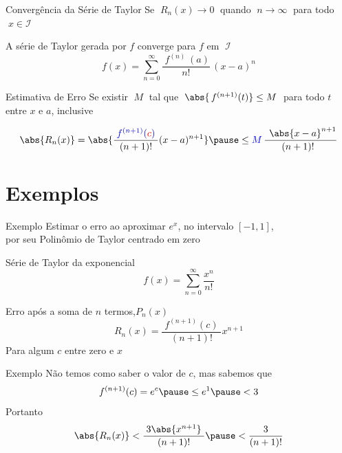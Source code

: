 \begin{frame}{Convergência da Série de Taylor}
Se \emph{\(\;R_n(x)\to 0\;\)} quando \emph{\(\;n\to\infty\;\)}
para todo \(\;x\in\mathcal{I}\;\)

\vspace{\baselineskip}
A série de Taylor gerada por $f$ converge para $f$ em \(\;\mathcal{I}\;\)
\[
  f(x) = \sum_{n=0}^\infty \frac{\;f^{(n)\;}(a)}{n!}\,(x-a)^n
\]
\end{frame}

\begin{frame}{Estimativa de Erro}
Se existir \(\;M\;\) tal que  \emph{\(\;\abs{\,f^{(n+1)}(t)} \leq M \;\)}
para todo \(t\) entre \(x\) e \(a\), inclusive

\pause
\vspace{\baselineskip}
\[
  \abs{R_n(x)}
  = \abs{\frac{\;{\color{blue}f^{(n+1)}({\color{red}c})}\;}{(n+1)!}(x-a)^{n+1}} \pause
  \leq {\color{blue} M}\, \frac{\;\,\abs{x-a}^{n+1}}{(n+1)!\;\;}
\]
\end{frame}

\section{Exemplos}

\addtocounter{exemplo}{1}
\begin{frame}{Exemplo \theexemplo}
    Estimar o erro ao aproximar \(e^x\), no intervalo \([-1, 1]\), \\
    por seu Polinômio de Taylor centrado em zero

   \vspace{0.5\baselineskip}
   \pause
   Série de Taylor da exponencial
   \[
     f(x) = \sum_{n=0}^\infty \frac{x^n}{n!}
   \]

   \pause
   Erro após a soma de $n$ termos,\(P_n(x)\)
   \[
     R_n(x)=\frac{\;f^{(n+1)}(c)\;}{(n+1)!}x^{n+1}
   \]
   Para algum $c$ entre zero e $x$
\end{frame}

\begin{frame}{Exemplo \theexemplo}
  Não temos como saber o valor de $c$\pause, mas sabemos que
  \[
    f^{(n+1)}(c) = e^c \pause \leq e^1 \pause < 3
  \]
  \pause
  Portanto
  \[
    \abs{R_n(x)} < \frac{\;3\abs{x^{n+1}}\;}{(n+1)!} \pause
                 < \frac{\;3\;}{(n+1)!}
  \]
\end{frame}

